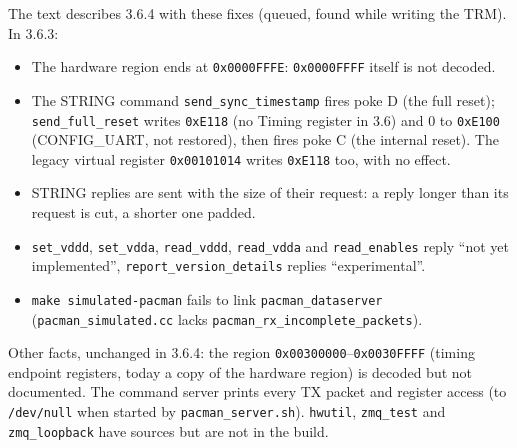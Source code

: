 \documentclass[12pt]{article}
\newcommand{\hex}[1]{\texttt{0x#1}}
\newcommand{\f}[1]{\texttt{#1}}
\begin{document}
The text describes 3.6.4 with these fixes (queued, found while writing the TRM).  In 3.6.3:
\begin{itemize}
\item The hardware region ends at \hex{0000FFFE}:  \hex{0000FFFF} itself is not decoded.
\item The STRING command \f{send\_sync\_timestamp} fires poke D (the full reset);
  \f{send\_full\_reset} writes \hex{E118} (no Timing register in 3.6) and 0 to \hex{E100}
  (CONFIG\_UART, not restored), then fires poke C (the internal reset).  The legacy virtual register
  \hex{00101014} writes \hex{E118} too, with no effect.
\item STRING replies are sent with the size of their request:  a reply longer than its request is
  cut, a shorter one padded.
\item \f{set\_vddd}, \f{set\_vdda}, \f{read\_vddd}, \f{read\_vdda} and \f{read\_enables} reply ``not
  yet implemented'', \f{report\_version\_details} replies ``experimental''.
\item \f{make simulated-pacman} fails to link \f{pacman\_dataserver} (\f{pacman\_simulated.cc} lacks
  \f{pacman\_rx\_incomplete\_packets}).
\end{itemize}
Other facts, unchanged in 3.6.4:  the region \hex{00300000}--\hex{0030FFFF} (timing endpoint
registers, today a copy of the hardware region) is decoded but not documented.  The command server
prints every TX packet and register access (to \f{/dev/null} when started by
\f{pacman\_server.sh}).  \f{hwutil}, \f{zmq\_test} and \f{zmq\_loopback} have sources but are
not in the build.
\end{document}
